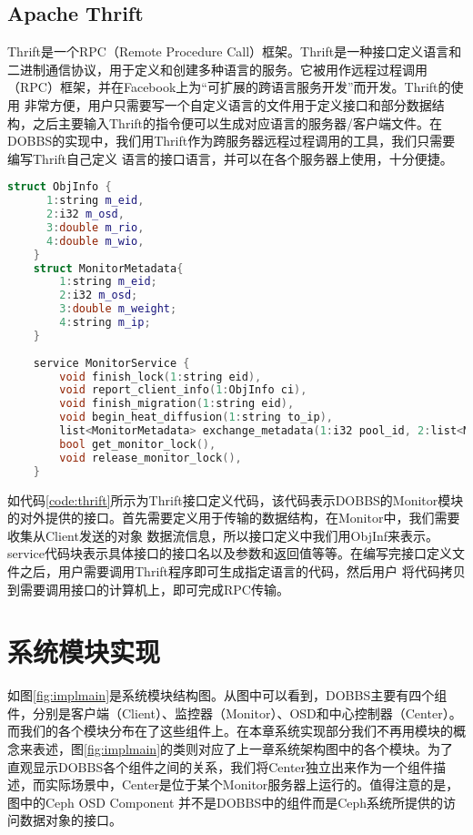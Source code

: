 \subsection{Apache Thrift}
Thrift是一个RPC（Remote Procedure Call）框架。Thrift是一种接口定义语言和二进制通信协议，用于定义和创建多种语言的服务。它被用作远程过程调用（RPC）框架，并在Facebook上为“可扩展的跨语言服务开发”而开发。Thrift的使用
非常方便，用户只需要写一个自定义语言的文件用于定义接口和部分数据结构，之后主要输入Thrift的指令便可以生成对应语言的服务器/客户端文件。在DOBBS的实现中，我们用Thrift作为跨服务器远程过程调用的工具，我们只需要编写Thrift自己定义
语言的接口语言，并可以在各个服务器上使用，十分便捷。
\begin{lstlisting}[language={C++}, caption={Thrift 接口定义示意}, label={code:thrift}]
    struct ObjInfo {
      1:string m_eid,
      2:i32 m_osd,
      3:double m_rio,
      4:double m_wio,
    }
    struct MonitorMetadata{
        1:string m_eid;
        2:i32 m_osd;
        3:double m_weight;
        4:string m_ip;
    }
    
    service MonitorService {
        void finish_lock(1:string eid),
        void report_client_info(1:ObjInfo ci),
        void finish_migration(1:string eid),
        void begin_heat_diffusion(1:string to_ip),
        list<MonitorMetadata> exchange_metadata(1:i32 pool_id, 2:list<MonitorMetadata> monitor_extents),
        bool get_monitor_lock(),
        void release_monitor_lock(),
    }
\end{lstlisting}

如代码\ref{code:thrift}所示为Thrift接口定义代码，该代码表示DOBBS的Monitor模块的对外提供的接口。首先需要定义用于传输的数据结构，在Monitor中，我们需要收集从Client发送的对象
数据流信息，所以接口定义中我们用ObjInf来表示。service代码块表示具体接口的接口名以及参数和返回值等等。在编写完接口定义文件之后，用户需要调用Thrift程序即可生成指定语言的代码，然后用户
将代码拷贝到需要调用接口的计算机上，即可完成RPC传输。

\section{系统模块实现}
如图\ref{fig:implmain}是系统模块结构图。从图中可以看到，DOBBS主要有四个组件，分别是客户端（Client）、监控器（Monitor）、OSD和中心控制器（Center）。
而我们的各个模块分布在了这些组件上。在本章系统实现部分我们不再用模块的概念来表述，图\ref{fig:implmain}的类则对应了上一章系统架构图中的各个模块。为了
直观显示DOBBS各个组件之间的关系，我们将Center独立出来作为一个组件描述，而实际场景中，Center是位于某个Monitor服务器上运行的。值得注意的是，图中的Ceph OSD Component
并不是DOBBS中的组件而是Ceph系统所提供的访问数据对象的接口。

